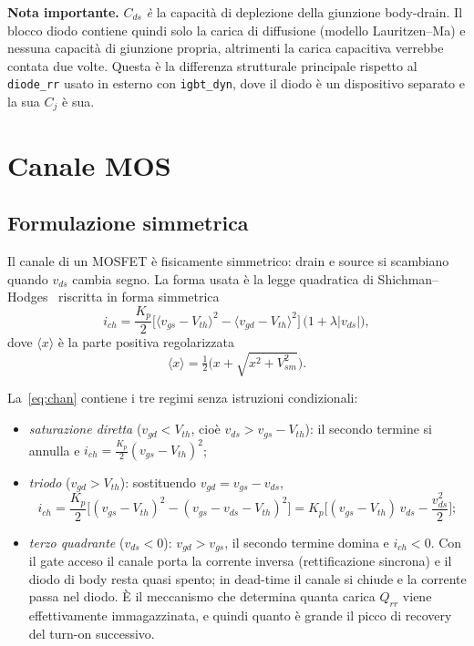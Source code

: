 \documentclass[11pt,a4paper]{article}
\newcommand{\ssc}[1]{\texttt{#1}}
\begin{document}
\medskip
\noindent \textbf{Nota importante.} $C_{ds}$ \emph{è} la capacità di
deplezione della giunzione body-drain. Il blocco diodo contiene quindi solo
la carica di diffusione (modello Lauritzen--Ma) e nessuna capacità di
giunzione propria, altrimenti la carica capacitiva verrebbe contata due
volte. Questa è la differenza strutturale principale rispetto al
\ssc{diode\_rr} usato in esterno con \ssc{igbt\_dyn}, dove il diodo è un
dispositivo separato e la sua $C_j$ è sua.

\section{Canale MOS}

\subsection{Formulazione simmetrica}

Il canale di un MOSFET è fisicamente simmetrico: drain e source si scambiano
quando $v_{ds}$ cambia segno. La forma usata è la legge quadratica di
Shichman--Hodges~\cite{Shichman1968} riscritta in forma simmetrica
\begin{equation}
  i_{ch} = \frac{K_p}{2}\Big[\langle v_{gs}-V_{th}\rangle^2
                            -\langle v_{gd}-V_{th}\rangle^2\Big]
           \,\big(1+\lambda|v_{ds}|\big),
  \label{eq:chan}
\end{equation}
dove $\langle x\rangle$ è la parte positiva regolarizzata
\begin{equation}
  \langle x\rangle = \tfrac12\Big(x+\sqrt{x^2+V_{sm}^2}\Big).
\end{equation}

La~\eqref{eq:chan} contiene i tre regimi senza istruzioni condizionali:
\begin{itemize}
  \item \emph{saturazione diretta} ($v_{gd}<V_{th}$, cioè $v_{ds}>v_{gs}-V_{th}$):
        il secondo termine si annulla e
        $i_{ch}=\frac{K_p}{2}(v_{gs}-V_{th})^2$;
  \item \emph{triodo} ($v_{gd}>V_{th}$): sostituendo $v_{gd}=v_{gs}-v_{ds}$,
        \[
          i_{ch}=\frac{K_p}{2}\big[(v_{gs}-V_{th})^2-(v_{gs}-v_{ds}-V_{th})^2\big]
                =K_p\Big[(v_{gs}-V_{th})\,v_{ds}-\frac{v_{ds}^2}{2}\Big];
        \]
  \item \emph{terzo quadrante} ($v_{ds}<0$): $v_{gd}>v_{gs}$, il secondo
        termine domina e $i_{ch}<0$. Con il gate acceso il canale porta la
        corrente inversa (rettificazione sincrona) e il diodo di body resta
        quasi spento; in dead-time il canale si chiude e la corrente passa
        nel diodo. È il meccanismo che determina quanta carica $Q_{rr}$ viene
        effettivamente immagazzinata, e quindi quanto è grande il picco di
        recovery del turn-on successivo.
\end{itemize}
\end{document}

